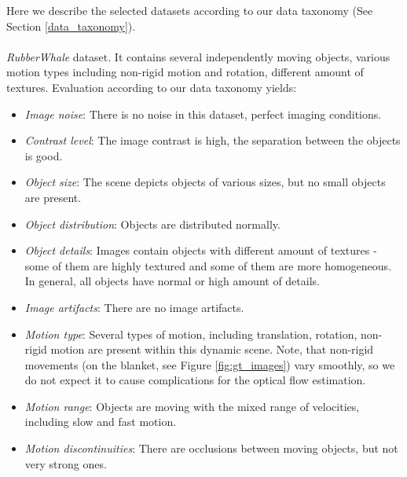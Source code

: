 Here we describe the selected datasets according to our data taxonomy (See Section \ref{data_taxonomy}). 
\\
\\
\textit{RubberWhale} dataset. It contains several independently moving objects, various motion types including non-rigid motion and rotation, different amount of textures.  
Evaluation according to our data taxonomy yields:
\begin{itemize}
	\item \textit{Image noise}: There is no noise in this dataset, perfect imaging conditions.
	
	\item \textit{Contrast level}:  The image contrast is high, the  separation between the objects is good.
	
	\item \textit{Object size}: The scene depicts objects of various sizes, but no small objects are present.
	
	\item \textit{Object distribution}: Objects are distributed normally.
	
	\item \textit{Object details}: Images contain objects with different amount of textures - some of them are highly textured and some of them are more homogeneous. In general, all objects have normal or high amount of details.
	
	\item \textit{Image artifacts}: There are no image  artifacts.
	
	\item \textit{Motion type}: Several types of motion, including translation, rotation, non-rigid motion are present within this dynamic scene. Note, that non-rigid movements (on the blanket, see Figure \ref{fig:gt_images}) vary smoothly, so we do not expect it to cause complications for the optical flow estimation.
	
	\item \textit{Motion range}: Objects are moving with the mixed range of velocities, including slow and fast motion.
	
	\item \textit{Motion discontinuities}: There are occlusions between moving objects, but not very strong ones.
\end{itemize}

